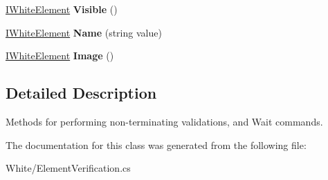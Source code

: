 \begin{DoxyCompactItemize}
\item 
\hypertarget{class_proto_test_1_1_golem_1_1_white_1_1_element_verification_af692d75fe34ecf531470bc6d18302a30}{\hyperlink{interface_proto_test_1_1_golem_1_1_white_1_1_elements_1_1_i_white_element}{I\-White\-Element} {\bfseries Visible} ()}\label{class_proto_test_1_1_golem_1_1_white_1_1_element_verification_af692d75fe34ecf531470bc6d18302a30}

\item 
\hypertarget{class_proto_test_1_1_golem_1_1_white_1_1_element_verification_a286643ce7ea186a821b44bd2057800b2}{\hyperlink{interface_proto_test_1_1_golem_1_1_white_1_1_elements_1_1_i_white_element}{I\-White\-Element} {\bfseries Name} (string value)}\label{class_proto_test_1_1_golem_1_1_white_1_1_element_verification_a286643ce7ea186a821b44bd2057800b2}

\item 
\hypertarget{class_proto_test_1_1_golem_1_1_white_1_1_element_verification_ac6f124cdb58de6905352ac976b116757}{\hyperlink{interface_proto_test_1_1_golem_1_1_white_1_1_elements_1_1_i_white_element}{I\-White\-Element} {\bfseries Image} ()}\label{class_proto_test_1_1_golem_1_1_white_1_1_element_verification_ac6f124cdb58de6905352ac976b116757}

\end{DoxyCompactItemize}


\subsection{Detailed Description}
Methods for performing non-\/terminating validations, and Wait commands. 



The documentation for this class was generated from the following file\-:\begin{DoxyCompactItemize}
\item 
White/Element\-Verification.\-cs\end{DoxyCompactItemize}
